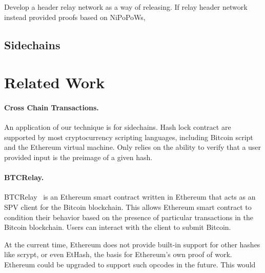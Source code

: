 Develop a header relay network as a way of releasing.
If relay header network instead provided proofs based on NiPoPoWs, 

\subsection{Sidechains}


\section{Related Work}

\paragraph{Cross Chain Transactions.}
An application of our technique is for sidechains.
Hash lock contract are supported by most cryptocurrency scripting languages, including Bitcoin script and the Ethereum virtual machine. Only relies on the ability to verify that a user provided input is the preimage of a given hash.

\paragraph{BTCRelay.}
BTCRelay~\cite{btcrelay} is an Ethereum smart contract written in Ethereum that acts as an SPV client for the Bitcoin blockchain.
This allows Ethereum smart contract to condition their behavior based on the presence of particular transactions in the Bitcoin blockchain.
Users can interact with the client to submit Bitcoin.

At the current time, Ethereum does not provide built-in support for other hashes like scrypt, or even EtHash, the basis for Ethereum's own proof of work. Ethereum could be upgraded to support such opcodes in the future. This would 
